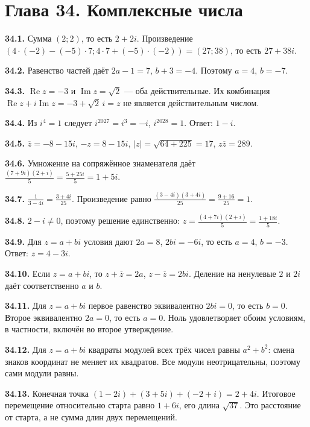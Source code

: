 \documentclass[12pt,a4paper,oneside,openany]{book}
\theoremstyle{colordef}\newtheorem{definition}{Определение}[chapter]
\theoremstyle{plain}\newtheorem{theorem}{Теорема}[chapter]
\theoremstyle{definition}\newtheorem{axiom}{Аксиома}[chapter]
\begin{document}
\section*{Глава 34. Комплексные числа}
\begingroup\setlength{\parskip}{3pt}
\textbf{34.1.} Сумма \((2;2)\), то есть \(2+2i\). Произведение \((4\cdot(-2)-(-5)\cdot7;4\cdot7+(-5)\cdot(-2))=(27;38)\), то есть \(27+38i\).\par
\textbf{34.2.} Равенство частей даёт \(2a-1=7\), \(b+3=-4\). Поэтому \(a=4\), \(b=-7\).\par
\textbf{34.3.} \(\operatorname{Re}z=-3\) и \(\operatorname{Im}z=\sqrt2\) — оба действительные. Их комбинация \(\operatorname{Re}z+i\operatorname{Im}z=-3+\sqrt2\,i=z\) не является действительным числом.\par
\textbf{34.4.} Из \(i^4=1\) следует \(i^{2027}=i^3=-i\), \(i^{2028}=1\). Ответ: \(1-i\).\par
\textbf{34.5.} \(\overline z=-8-15i\), \(-z=8-15i\), \(|z|=\sqrt{64+225}=17\), \(z\overline z=289\).\par
\textbf{34.6.} Умножение на сопряжённое знаменателя даёт \(\frac{(7+9i)(2+i)}5=\frac{5+25i}5=1+5i\).\par
\textbf{34.7.} \(\frac1{3-4i}=\frac{3+4i}{25}\). Произведение равно \(\frac{(3-4i)(3+4i)}{25}=\frac{9+16}{25}=1\).\par
\textbf{34.8.} \(2-i\ne0\), поэтому решение единственно: \(z=\frac{(4+7i)(2+i)}5=\frac{1+18i}5\).\par
\textbf{34.9.} Для \(z=a+bi\) условия дают \(2a=8\), \(2bi=-6i\), то есть \(a=4\), \(b=-3\). Ответ: \(z=4-3i\).\par
\textbf{34.10.} Если \(z=a+bi\), то \(z+\overline z=2a\), \(z-\overline z=2bi\). Деление на ненулевые \(2\) и \(2i\) даёт соответственно \(a\) и \(b\).\par
\textbf{34.11.} Для \(z=a+bi\) первое равенство эквивалентно \(2bi=0\), то есть \(b=0\). Второе эквивалентно \(2a=0\), то есть \(a=0\). Ноль удовлетворяет обоим условиям, в частности, включён во второе утверждение.\par
\textbf{34.12.} Для \(z=a+bi\) квадраты модулей всех трёх чисел равны \(a^2+b^2\): смена знаков координат не меняет их квадратов. Все модули неотрицательны, поэтому сами модули равны.\par
\textbf{34.13.} Конечная точка \((1-2i)+(3+5i)+(-2+i)=2+4i\). Итоговое перемещение относительно старта равно \(1+6i\), его длина \(\sqrt{37}\). Это расстояние от старта, а не сумма длин двух перемещений.\par
\end{document}
